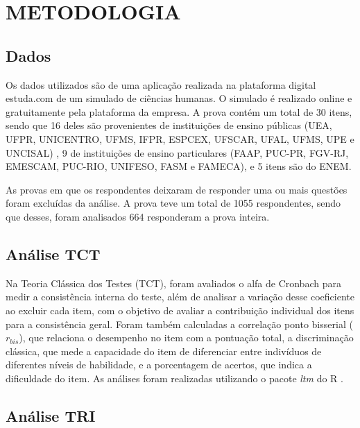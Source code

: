\chapter{METODOLOGIA}

\section{Dados}

Os dados utilizados são  de uma aplicação realizada na plataforma digital estuda.com de um simulado de ciências humanas. O simulado é realizado online e gratuitamente pela plataforma da empresa. 
A prova contém um total de 30 itens, sendo que 16 deles são provenientes de instituições de ensino públicas (UEA, UFPR, UNICENTRO, UFMS, IFPR, ESPCEX, UFSCAR, UFAL, UFMS, UPE e UNCISAL) , 9 de instituições de ensino particulares (FAAP, PUC-PR, FGV-RJ, EMESCAM, PUC-RIO, UNIFESO, FASM e FAMECA), e 5 itens são do ENEM.


As provas em que os respondentes deixaram de responder uma ou mais questões foram excluídas da análise. A prova teve um total de 1055 respondentes, sendo que desses, foram analisados 664 responderam a prova inteira.



\section{Análise TCT}

Na Teoria Clássica dos Testes (TCT), foram avaliados o alfa de Cronbach para medir a consistência interna do teste, além de analisar a variação desse coeficiente ao excluir cada item, com o objetivo de avaliar a contribuição individual dos itens para a consistência geral. Foram também calculadas a correlação ponto bisserial ($r_{bis}$), que relaciona o desempenho no item com a pontuação total, a discriminação clássica, que mede a capacidade do item de diferenciar entre indivíduos de diferentes níveis de habilidade, e a porcentagem de acertos, que indica a dificuldade do item. As análises foram realizadas utilizando o pacote \textit{ltm} \cite{ltm} do R \cite{r}.



\section{Análise TRI}

